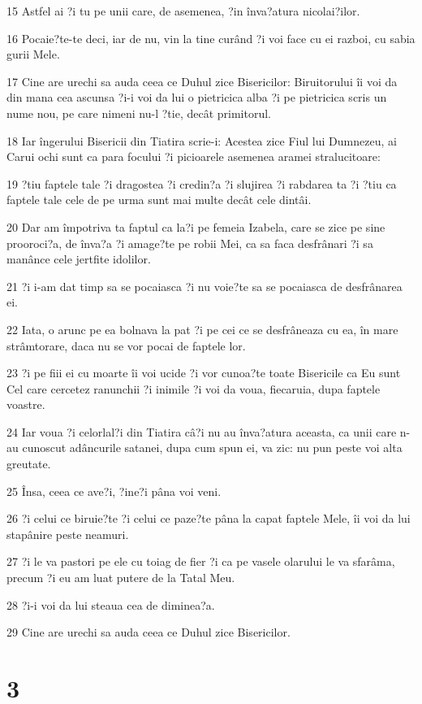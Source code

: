 \par 15 Astfel ai ?i tu pe unii care, de asemenea, ?in înva?atura nicolai?ilor.
\par 16 Pocaie?te-te deci, iar de nu, vin la tine curând ?i voi face cu ei razboi, cu sabia gurii Mele.
\par 17 Cine are urechi sa auda ceea ce Duhul zice Bisericilor: Biruitorului îi voi da din mana cea ascunsa ?i-i voi da lui o pietricica alba ?i pe pietricica scris un nume nou, pe care nimeni nu-l ?tie, decât primitorul.
\par 18 Iar îngerului Bisericii din Tiatira scrie-i: Acestea zice Fiul lui Dumnezeu, ai Carui ochi sunt ca para focului ?i picioarele asemenea aramei stralucitoare:
\par 19 ?tiu faptele tale ?i dragostea ?i credin?a ?i slujirea ?i rabdarea ta ?i ?tiu ca faptele tale cele de pe urma sunt mai multe decât cele dintâi.
\par 20 Dar am împotriva ta faptul ca la?i pe femeia Izabela, care se zice pe sine prooroci?a, de înva?a ?i amage?te pe robii Mei, ca sa faca desfrânari ?i sa manânce cele jertfite idolilor.
\par 21 ?i i-am dat timp sa se pocaiasca ?i nu voie?te sa se pocaiasca de desfrânarea ei.
\par 22 Iata, o arunc pe ea bolnava la pat ?i pe cei ce se desfrâneaza cu ea, în mare strâmtorare, daca nu se vor pocai de faptele lor.
\par 23 ?i pe fiii ei cu moarte îi voi ucide ?i vor cunoa?te toate Bisericile ca Eu sunt Cel care cercetez ranunchii ?i inimile ?i voi da voua, fiecaruia, dupa faptele voastre.
\par 24 Iar voua ?i celorlal?i din Tiatira câ?i nu au înva?atura aceasta, ca unii care n-au cunoscut adâncurile satanei, dupa cum spun ei, va zic: nu pun peste voi alta greutate.
\par 25 Însa, ceea ce ave?i, ?ine?i pâna voi veni.
\par 26 ?i celui ce biruie?te ?i celui ce paze?te pâna la capat faptele Mele, îi voi da lui stapânire peste neamuri.
\par 27 ?i le va pastori pe ele cu toiag de fier ?i ca pe vasele olarului le va sfarâma, precum ?i eu am luat putere de la Tatal Meu.
\par 28 ?i-i voi da lui steaua cea de diminea?a.
\par 29 Cine are urechi sa auda ceea ce Duhul zice Bisericilor.

\chapter{3}

